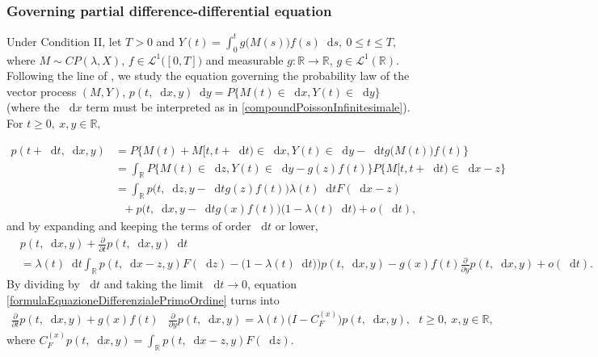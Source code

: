 \documentclass[12pt, twoside, english, headsepline]{article}
\newcommand*\dif{\mathop{}\!\mathrm{d}}  %
\theoremstyle{definition} %
\numberwithin{equation}{section} %
\begin{document}
\subsubsection{Governing partial difference-differential equation}

Under Condition II, let $T>0$ and $Y(t) = \int_0^t g\big(M(s)\big) f(s)\dif s,\ 0\le t\le T,$ where $M\sim CP(\lambda, X)$, $f\in \mathcal{L}^1\big([0,T]\big)$ and measurable $g: \mathbb{R}\longrightarrow \mathbb{R}$, $g\in\mathcal{L}^1(\mathbb{R})$. Following the line of \cite{GMn1971, Mn1970, P1966, P1968}, we study the equation governing the probability law of the vector process $(M,Y)$, $p(t,\dif x, y) \dif y = P\{M(t)\in\dif x, Y(t)\in\dif y\}$ (where the $\dif x$ term must be interpreted as in \eqref{compoundPoissonInfinitesimale}). For $t\ge0,\ x,y \in\mathbb{R},$

\begin{align}
	p(t+\dif t,\dif x, y) &= P\{M(t)+M[t,t+\dif t) \in \dif x, Y(t)\in\dif y - \dif t g\big(M(t)\big)f(t) \} \nonumber\\
	& = \int_\mathbb{R} P\{M(t)\in \dif z, Y(t)\in \dif y-g(z)f(t)\}P\{M[t,t+\dif t)\in\dif x-z\} \nonumber\\
	& = \int_\mathbb{R} p\big(t, \dif z, y-\dif t g(z)f(t)\big)\lambda(t)\dif t F(\dif x -z)\nonumber \\
	&\ \ \ +p\big(t, \dif x, y-\dif t g(x) f(t)\big) \big(1-\lambda(t)\dif t\big)+ o(\dif t),\nonumber
\end{align}
and by expanding and keeping the terms of order $\dif t$ or lower,
\begin{align}
	&p(t,\dif x, y) + \frac{\partial}{\partial t}p(t,\dif x,y)\dif t\label{formulaEquazioneDifferenzialePrimoOrdine}\\
	&=  \lambda(t)\dif t\int_\mathbb{R} p(t,\dif x-z, y)F(\dif z) - \big(1-\lambda(t)\dif t)\big)p(t,\dif x,y) -  g(x)f(t) \frac{\partial}{\partial y}p(t,\dif x, y) +o(\dif t).\nonumber
\end{align}
By dividing by $\dif t$ and taking the limit $\dif t\longrightarrow 0$, equation \eqref{formulaEquazioneDifferenzialePrimoOrdine} turns into
	\begin{align}
	\frac{\partial}{\partial t}p(t, \dif x, y)+ g(x)f(t)& \frac{\partial}{\partial y}p(t, \dif x, y) = \lambda(t) \Big(I-C_F^{(x)}\Big) p(t, \dif x, y) , \ \ \ t\ge0,\ x,y \in\mathbb{R},
\end{align}
where $C_{F}^{(x)} p(t,\dif x, y) =\int_\mathbb{R} p(t,\dif x - z, y) F(\dif z)$.
\\
\end{document}
